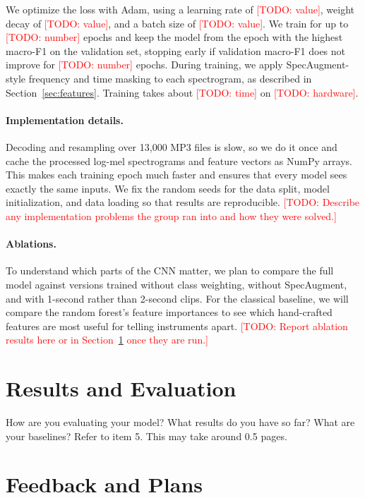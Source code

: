 \documentclass[11pt]{article}
\newcommand{\todo}[1]{\textcolor{red}{[TODO: #1]}}
\begin{document}
We optimize the loss with Adam, using a learning rate of \todo{value}, weight decay of \todo{value}, and a batch size of \todo{value}. We train for up to \todo{number} epochs and keep the model from the epoch with the highest macro-F1 on the validation set, stopping early if validation macro-F1 does not improve for \todo{number} epochs. During training, we apply SpecAugment-style frequency and time masking to each spectrogram, as described in Section~\ref{sec:features}. Training takes about \todo{time} on \todo{hardware}.

\paragraph{Implementation details.} Decoding and resampling over 13,000 MP3 files is slow, so we do it once and cache the processed log-mel spectrograms and feature vectors as NumPy arrays. This makes each training epoch much faster and ensures that every model sees exactly the same inputs. We fix the random seeds for the data split, model initialization, and data loading so that results are reproducible. \todo{Describe any implementation problems the group ran into and how they were solved.}

\paragraph{Ablations.} To understand which parts of the CNN matter, we plan to compare the full model against versions trained without class weighting, without SpecAugment, and with 1-second rather than 2-second clips. For the classical baseline, we will compare the random forest's feature importances to see which hand-crafted features are most useful for telling instruments apart. \todo{Report ablation results here or in Section~\ref{sec:results} once they are run.}

\section{Results and Evaluation}
\label{sec:results}

How are you evaluating your model? What results do you have so far? What are your baselines? Refer to item 5. This may take around 0.5 pages.

\section{Feedback and Plans}
\end{document}

